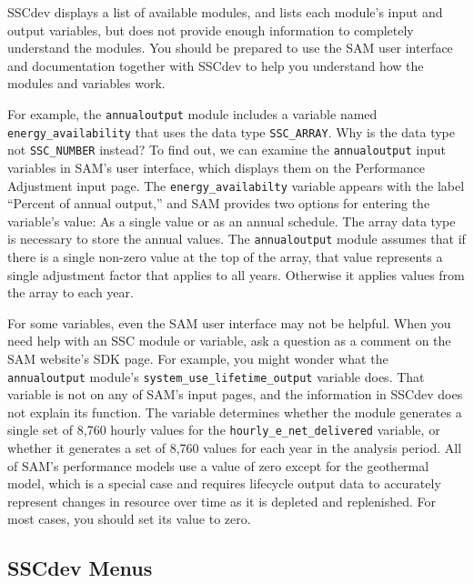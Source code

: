 \documentclass{article}
\begin{document}
SSCdev displays a list of available modules, and lists each module's input and output variables, but does not provide enough information to completely understand the modules. You should be prepared to use the SAM user interface and documentation together with SSCdev to help you understand how the modules and variables work. 

For example, the \texttt{annualoutput} module includes a variable named \texttt{energy\_availability} that uses the data type \texttt{SSC\_ARRAY}. Why is the data type not \texttt{SSC\_NUMBER} instead? To find out, we can examine the \texttt{annualoutput} input variables in SAM's user interface, which displays them on the Performance Adjustment input page. The \texttt{energy\_availabilty} variable appears with the label ``Percent of annual output,'' and SAM provides two options for entering the variable's value: As a single value or as an annual schedule. The array data type is necessary to store the annual values. The \texttt{annualoutput} module assumes that if there is a single non-zero value at the top of the array, that value represents a single adjustment factor that applies to all years. Otherwise it applies values from the array to each year.

For some variables, even the SAM user interface may not be helpful. When you need help with an SSC module or variable, ask a question as a comment on the SAM website's SDK page. For example, you might wonder what the \texttt{annualoutput} module's \texttt{system\_use\_lifetime\_output} variable does. That variable is not on any of SAM's input pages, and the information in SSCdev does not explain its function. The variable determines whether the module generates a single set of 8,760 hourly values for the \texttt{hourly\_e\_net\_delivered} variable, or whether it generates a set of 8,760 values for each year in the analysis period. All of SAM's performance models use a value of zero except for the geothermal model, which is a special case and requires lifecycle output data to accurately represent changes in resource over time as it is depleted and replenished. For most cases, you should set its value to zero.

\subsection{SSCdev Menus}
\label{sec_menus}
\end{document}

